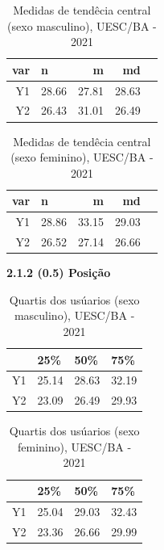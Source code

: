 \documentclass[12pt]{article}\usepackage[]{graphicx}\usepackage[]{color}
\begin{document}
\begin{table}[!ht]
  \centering
  \caption{Medidas de tendêcia central (sexo masculino), UESC/BA - 2021}
  \begin{tabular}{rlrrr} 
    \toprule
    var & n & m & md \\ 
    \midrule
  Y1 & 28.66 & 27.81 & 28.63 \\ 
  Y2 & 26.43 & 31.01 & 26.49 \\ 
     \bottomrule
  \end{tabular}
\end{table}


\begin{table}[!ht]
  \centering
  \caption{Medidas de tendêcia central (sexo feminino), UESC/BA - 2021}
  \begin{tabular}{rlrrr}
    \toprule   
    var & n & m & md \\ 
    \midrule
  Y1 & 28.86 & 33.15 & 29.03 \\ 
  Y2 & 26.52 & 27.14 & 26.66 \\ 
     \bottomrule
  \end{tabular}
\end{table}
\textbf{2.1.2 (0.5) Posição}


\begin{table}[!ht]
  \centering
  \caption{Quartis dos usúarios (sexo masculino), UESC/BA - 2021}
\begin{tabular}{llll}
\hline
   & 25\%  & 50\%  & 75\%  \\ \hline
Y1 & 25.14 & 28.63 & 32.19 \\
Y2 & 23.09 & 26.49 & 29.93 \\ \hline
\end{tabular}
\end{table}

\begin{table}[!ht]
  \centering
  \caption{Quartis dos usúarios (sexo feminino), UESC/BA - 2021}
\begin{tabular}{llll}
\hline
   & 25\%  & 50\%  & 75\%  \\ \hline
Y1 & 25.04 & 29.03 & 32.43 \\
Y2 & 23.36 & 26.66 & 29.99 \\ \hline
\end{tabular}
\end{table}
\end{document}
